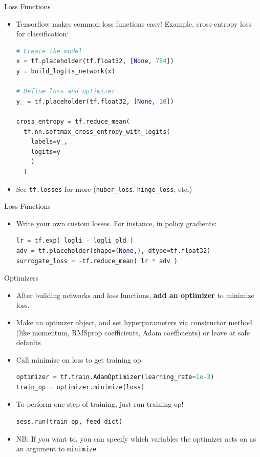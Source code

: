 \documentclass[]{beamer}
\begin{document}
\begin{frame}[fragile]{Loss Functions}

\begin{itemize}
\item Tensorflow makes common loss functions easy! Example, cross-entropy loss for classification:
\begin{lstlisting}[language=python]
# Create the model
x = tf.placeholder(tf.float32, [None, 784])
y = build_logits_network(x)

# Define loss and optimizer
y_ = tf.placeholder(tf.float32, [None, 10])

cross_entropy = tf.reduce_mean(
  tf.nn.softmax_cross_entropy_with_logits(
    labels=y_, 
    logits=y
    )
  )
\end{lstlisting}
\item See \verb|tf.losses| for more (\verb|huber_loss|, \verb|hinge_loss|, etc.)
\end{itemize}
\end{frame}

\begin{frame}[fragile]{Loss Functions}
\begin{itemize}
\item Write your own custom losses. For instance, in policy gradients:
\begin{lstlisting}[language=python]
lr = tf.exp( logli - logli_old )
adv = tf.placeholder(shape=(None,), dtype=tf.float32)
surrogate_loss = -tf.reduce_mean( lr * adv )
\end{lstlisting}

\end{itemize}

\end{frame}

\begin{frame}[fragile]{Optimizers}

\begin{itemize}
\item After building networks and loss functions, \textbf{add an optimizer} to minimize loss.
\item Make an optimzer object, and set hyperparameters via constructor method (like momentum, RMSprop coefficients, Adam coefficients) or leave at safe defaults
\item Call minimize on loss to get training op:
\begin{lstlisting}[language=python]
optimizer = tf.train.AdamOptimizer(learning_rate=1e-3)
train_op = optimizer.minimize(loss)
\end{lstlisting}
\item To perform one step of training, just run training op!
\begin{lstlisting}[language=python]
sess.run(train_op, feed_dict)
\end{lstlisting}
\item NB: If you want to, you can specify which variables the optimizer acts on as an argument to \verb|minimize|
\end{itemize}

\end{frame}
\end{document}

